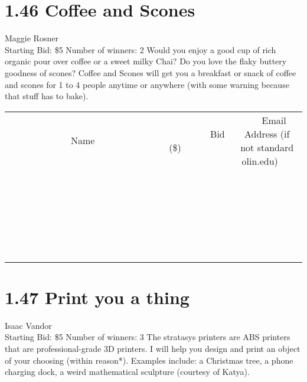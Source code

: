 \documentclass[11pt]{article}
\begin{document}
\section*{1.46 Coffee and Scones}
Maggie Rosner
\\
Starting Bid: \$5
\newline
Number of winners: 2
\newline
Would you enjoy a good cup of rich organic pour over coffee or a sweet milky Chai? Do you love the flaky buttery goodness of scones? 
Coffee and Scones will get you a breakfast or snack of coffee and scones for 1 to 4 people anytime or anywhere (with some warning because that stuff has to bake).
\\[6ex]
\begin{tabular}{c c c}
~~~~~~~~~~~~~Name~~~~~~~~~~~~~ & ~~~~~~~~~Bid (\$)~~~~~~~~~  & ~~~Email Address (if not standard olin.edu)~~~\\
 & & \\
\hline
 & & \\
\hline
 & & \\
\hline
 & & \\
\hline
 & & \\
\hline
 & & \\
\hline
 & & \\
\hline
 & & \\
\hline
 & & \\
\hline
 & & \\
\hline
 & & \\
\hline
 & & \\
\hline
 & & \\
\hline
 & & \\
\hline
 & & \\
\hline
 & & \\
\hline
 & & \\
\hline
 & & \\
\hline
 & & \\
\hline
 & & \\
\hline
 & & \\
\hline
 & & \\
\hline
 & & \\
\hline
 & & \\
\hline
 & & \\
\hline
 & & \\
\hline
\end{tabular}
\newpage
\section*{1.47 Print you a thing}
Isaac Vandor
\\
Starting Bid: \$5
\newline
Number of winners: 3
\newline
The stratasys printers are ABS printers that are professional-grade 3D printers. I will help you design and print an object of your choosing (within reason*). Examples include: a Christmas tree, a phone charging dock, a weird mathematical sculpture (courtesy of Katya). 
\end{document}
